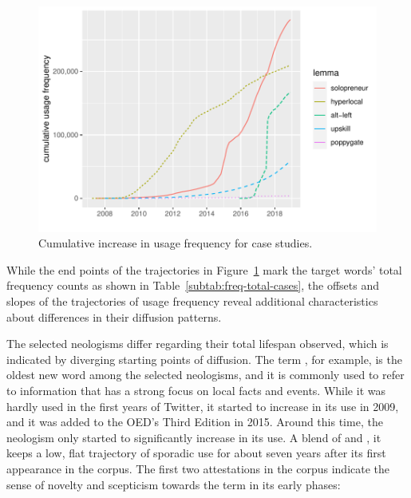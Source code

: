 \documentclass[
  a4paper,
  abstract=on,
  captions=tableabove
  ]{scrartcl}
\begin{document}
      \begin{figure}
        \caption[Cumulative increase in usage frequency]{Cumulative increase in usage frequency for case studies.\protect\footnotemark}
        \label{fig:freq_cum_cases}
        \centering
        \includegraphics[width=.8\linewidth]{img/freq_cum_cases.pdf}
      \end{figure}

      While the end points of the trajectories in Figure~\ref{fig:freq_cum_cases} mark the target words' total frequency counts as shown in Table~\ref{subtab:freq-total-cases}, the offsets and slopes of the trajectories of usage frequency reveal additional characteristics about differences in their diffusion patterns.



      The selected neologisms differ regarding their total lifespan observed, which is indicated by diverging starting points of diffusion. The term , for example, is the oldest new word among the selected neologisms, and it is commonly used to refer to information that has a strong focus on local facts and events. While it was hardly used in the first years of Twitter, it started to increase in its use in 2009, and it was added to the OED's Third Edition in 2015. Around this time, the neologism  only started to significantly increase in its use. A blend of  and , it keeps a low, flat trajectory of sporadic use for about seven years after its first appearance in the corpus. The first two attestations in the corpus indicate the sense of novelty and scepticism towards the term in its early phases:
\end{document}
